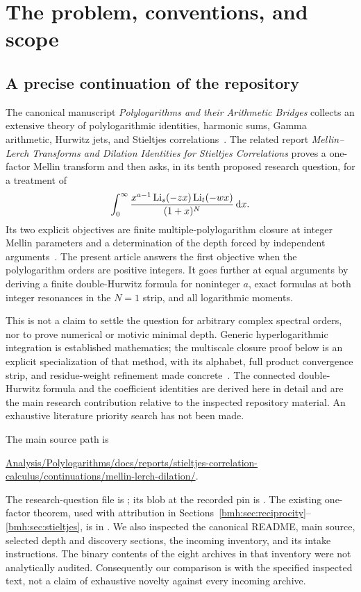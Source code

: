 \section{The problem, conventions, and scope}\label{bmh:sec:scope}

\subsection{A precise continuation of the repository}
The canonical manuscript \emph{Polylogarithms and their Arithmetic Bridges}
collects an extensive theory of polylogarithmic identities, harmonic sums,
Gamma arithmetic, Hurwitz jets, and Stieltjes correlations~\cite{Repo}.
The related report \emph{Mellin--Lerch Transforms and Dilation Identities for
Stieltjes Correlations} proves a one-factor Mellin transform and then asks,
in its tenth proposed research question, for a treatment of
\begin{equation}\label{bmh:eq:problem}
 \int_0^\infty\frac{x^{a-1}\operatorname{Li}_s(-zx)\operatorname{Li}_t(-wx)}{(1+x)^N}\,\mathrm d x.
\end{equation}
Its two explicit objectives are finite multiple-polylogarithm closure at
integer Mellin parameters and a determination of the depth forced by
independent arguments~\cite{MLD}. The present article answers the first
objective when the polylogarithm orders are positive integers. It goes
further at equal arguments by deriving a finite double-Hurwitz formula
for noninteger $a$, exact formulas at both integer resonances in the
$N=1$ strip, and all logarithmic moments.

This is not a claim to settle the question for arbitrary complex spectral
orders, nor to prove numerical or motivic minimal depth. Generic
hyperlogarithmic integration is established mathematics; the multiscale
closure proof below is an explicit specialization of that method, with
its alphabet, full product convergence strip, and residue-weight
refinement made concrete~\cite{Panzer}. The connected double-Hurwitz
formula and the coefficient identities are derived here in detail and
are the main research contribution relative to the inspected repository
material. An exhaustive literature priority search has not been made.

The main source path is
\begin{center}\small
\url{Analysis/Polylogarithms/docs/reports/stieltjes-correlation-calculus/continuations/mellin-lerch-dilation/}.
\end{center}
The research-question file is ; its
blob at the recorded pin is
.
The existing one-factor theorem, used with attribution in
Sections~\ref{bmh:sec:reciprocity}--\ref{bmh:sec:stieltjes}, is in
. We also inspected the canonical README,
main source, selected depth and discovery sections, the incoming
inventory, and its intake instructions. The binary contents of the eight
archives in that inventory were not analytically audited. Consequently
our comparison is with the specified inspected text, not a claim of
exhaustive novelty against every incoming archive.

